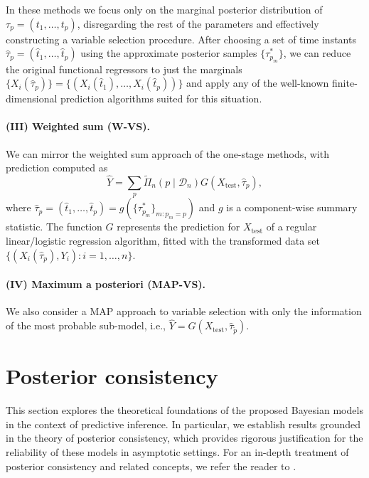 \documentclass{article}
\numberwithin{equation}{section}
\theoremstyle{plain}
\theoremstyle{definition}
\begin{document}
In these methods we focus only on the marginal posterior distribution of \(\tau_p = (t_1, \dots, t_p)\), disregarding the rest of the parameters and effectively constructing a variable selection procedure. After choosing a set of time instants \(\hat \tau_p=(\hat t_1,\dots, \hat t_p)\) using the approximate posterior samples \(\{\tau^*_{p_m}\}\), we can reduce the original functional regressors to just the marginals \(\{X_i(\hat \tau_p)\}=\{(X_i(\hat t_1),\dots, X_i(\hat t_p))\}\) and apply any of the well-known finite-dimensional prediction algorithms suited for this situation.

\paragraph*{(III) Weighted sum (W-VS).} We can mirror the weighted sum approach of the one-stage methods, with prediction computed as
\[
  \hat Y = \sum_{p} \tilde\Pi_n(p\mid \mathcal D_n) G(X_{\text{test}}, \hat \tau_{p}),
\]
where \(\hat \tau_{p}=(\hat t_1, \dots ,\hat t_p)=g(\{\tau^*_{p_m}\}_{m:p_m=p})\) and \(g\) is a component-wise summary statistic. The function \(G\) represents the prediction for \(X_{\text{test}}\) of a regular linear/logistic regression algorithm, fitted with the transformed data set \(\{(X_i(\hat \tau_p), Y_i): i=1,\dots,n\}\).

\paragraph*{(IV) Maximum a posteriori (MAP-VS).} We also consider a MAP approach to variable selection with only the information of the most probable sub-model, i.e., \(\hat Y = G(X_{\text{test}}, \hat \tau_{\tilde p})\).


\section{Posterior consistency}\label{sec:consistency}

This section explores the theoretical foundations of the proposed Bayesian models in the context of predictive inference. In particular, we establish results grounded in the theory of posterior consistency, which provides rigorous justification for the reliability of these models in asymptotic settings. For an in-depth treatment of posterior consistency and related concepts, we refer the reader to \citet{ghosal2017fundamentals}.
\end{document}
